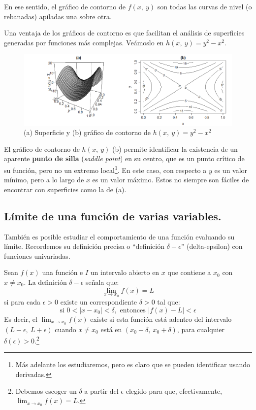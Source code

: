 \documentclass[12pt]{article}
\begin{document}
En ese sentido, el gráfico de contorno de $f(x, \ y)$ son todas las curvas de nivel (o rebanadas) apiladas una sobre otra.

Una ventaja de los gráficos de contorno es que facilitan el análisis de superficies generadas por funciones más complejas. Veámoslo en $h(x, \ y) = y^{2} - x^{2}$.

\begin{figure}[hbt!]
\centering
\includegraphics[scale= 0.45]{contorno-03.png}
\caption{(a) Superficie y (b) gráfico de contorno de $h(x, \ y) = y^{2} - x^{2}$}
\end{figure}

El gráfico de contorno de $h(x, \ y)$ (b) permite identificar la existencia de un aparente \textbf{punto de silla} (\textit{saddle point}) en su centro, que es un punto crítico de su función, pero no un extremo local\footnote{Más adelante los estudiaremos, pero es claro que se pueden identificar usando derivadas.}. En este caso, con respecto a $y$ es un valor mínimo, pero a lo largo de $x$ es un valor máximo. Estos no siempre son fáciles de encontrar con superficies como la de (a).

\subsection{Límite de una función de varias variables.}

También es posible estudiar el comportamiento de una función evaluando su límite. Recordemos su definición precisa o ``definición $\delta-\epsilon$'' (delta-epsilon) con funciones univariadas.

Sean $f(x)$ una función e $I$ un intervalo abierto en $x$ que contiene a $x_{0}$ con $x \neq x_{0}$. La definición $\delta - \epsilon$ señala que:
\[
  \lim_{x \to x_{0}} f(x) = L
\]
si para cada $\epsilon > 0$ existe un correspondiente $\delta > 0$ tal que:
\[
  \text{si } 0 < |x - x_{0}| < \delta, \text{ entonces } |f(x) - L| < \epsilon
\]
Es decir, el $\lim_{x \to x_{0}} f(x)$ existe si esta función está adentro del intervalo $(L - \epsilon, \ L + \epsilon)$ cuando $x \neq x_{0}$ está en $(x_{0} - \delta, \ x_{0} + \delta)$, para cualquier $\delta(\epsilon) > 0$.\footnote{Debemos escoger un $\delta$ a partir del $\epsilon$ elegido para que, efectivamente, $\lim_{x \to x_{0}} f(x) = L$.}
\end{document}
